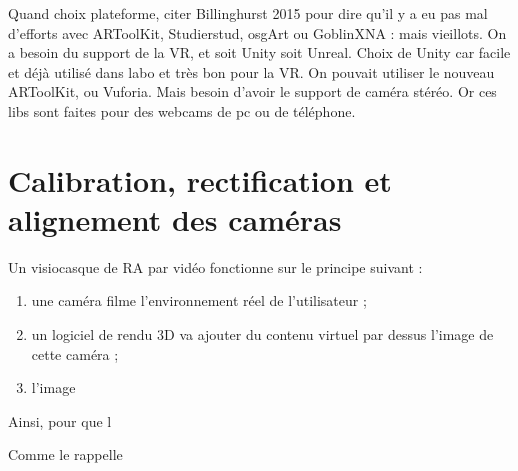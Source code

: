 Quand choix plateforme, citer Billinghurst 2015 pour dire qu'il y a eu pas mal d'efforts avec ARToolKit, Studierstud, osgArt ou GoblinXNA : mais vieillots. On a besoin du support de la VR, et soit Unity soit Unreal. Choix de Unity car facile et déjà utilisé dans labo et très bon pour la VR.
On pouvait utiliser le nouveau ARToolKit, ou Vuforia. Mais besoin d'avoir le support de caméra stéréo. Or ces libs sont faites pour des webcams de pc ou de téléphone.


\section{Calibration, rectification et alignement des caméras}
Un visiocasque de RA par vidéo fonctionne sur le principe suivant :
\begin{enumerate}
  \item une caméra filme l'environnement réel de l'utilisateur ;
  \item un logiciel de rendu 3D va ajouter du contenu virtuel par dessus l'image de cette caméra ;
  \item l'image
\end{enumerate}

Ainsi, pour que l

Comme le rappelle \cite[p. ]{Billinghurst2015}


